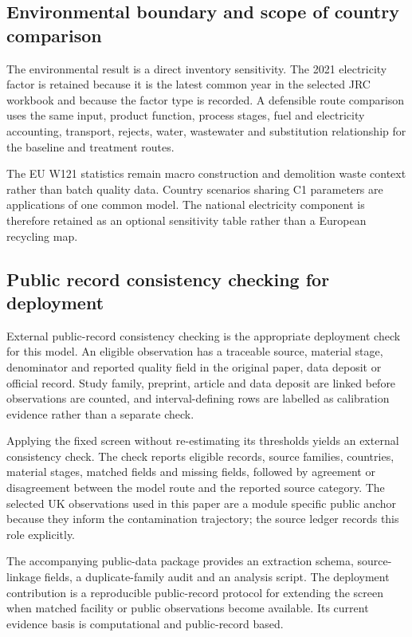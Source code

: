 \documentclass[pdflatex,sn-basic]{sn-jnl}
\begin{document}
\subsection{Environmental boundary and scope of country comparison}\label{environmental-boundary-and-scope-of-country-comparison}

The environmental result is a direct inventory sensitivity. The 2021 electricity factor is retained because it is the latest common year in the selected JRC workbook and because the factor type is recorded. A defensible route comparison uses the same input, product function, process stages, fuel and electricity accounting, transport, rejects, water, wastewater and substitution relationship for the baseline and treatment routes.

The EU W121 statistics remain macro construction and demolition waste context rather than batch quality data. Country scenarios sharing C1 parameters are applications of one common model. The national electricity component is therefore retained as an optional sensitivity table rather than a European recycling map.

\subsection{Public record consistency checking for deployment}\label{public-record-consistency-checking-for-deployment}

External public-record consistency checking is the appropriate deployment check for this model. An eligible observation has a traceable source, material stage, denominator and reported quality field in the original paper, data deposit or official record. Study family, preprint, article and data deposit are linked before observations are counted, and interval-defining rows are labelled as calibration evidence rather than a separate check.

Applying the fixed screen without re-estimating its thresholds yields an external consistency check. The check reports eligible records, source families, countries, material stages, matched fields and missing fields, followed by agreement or disagreement between the model route and the reported source category. The selected UK observations used in this paper are a module specific public anchor because they inform the contamination trajectory; the source ledger records this role explicitly.

The accompanying public-data package provides an extraction schema, source-linkage fields, a duplicate-family audit and an analysis script. The deployment contribution is a reproducible public-record protocol for extending the screen when matched facility or public observations become available. Its current evidence basis is computational and public-record based.
\end{document}
